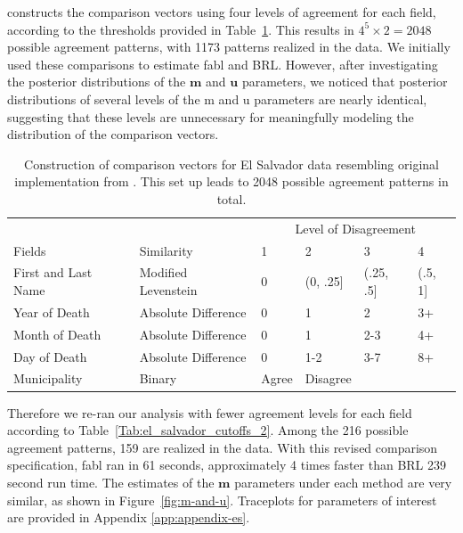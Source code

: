 \documentclass[ba]{imsart}
\begin{document}
	\cite{sadinle_bayesian_2017} constructs the comparison vectors using four levels of agreement for each field, according to the thresholds provided in Table~\ref{Tab:el_salvador_cutoffs_1}. This results in \(4^5 \times 2 = 2048\) possible agreement patterns, with 1173 patterns realized in the data. We initially used these comparisons to estimate fabl and BRL.  However, after investigating the posterior distributions of the $\bm{m}$ and $\bm{u}$ parameters, we noticed that posterior distributions of several levels of the m and u parameters are nearly identical, suggesting that these levels are unnecessary for meaningfully modeling the distribution of the comparison vectors. 
	
	
	
	\begin{table}
		\begin{tabular}[t]{llllll}
			\hline
			\multicolumn{2}{c}{ } & \multicolumn{4}{c}{Level of Disagreement} \\
			\cline{3-6}
			Fields & Similarity & 1 & 2 & 3 & 4\\
			\hline
			First and Last Name & Modified Levenstein & 0 & (0, .25] & (.25, .5] & (.5, 1]\\
			Year of Death & Absolute Difference & 0 & 1 & 2 & 3+\\
			Month of Death & Absolute Difference & 0 & 1 & 2-3 & 4+\\
			Day of Death & Absolute Difference & 0 & 1-2 & 3-7 & 8+\\
			Municipality & Binary & Agree & Disagree &  & \\
			\hline
		\end{tabular}
		\caption{Construction of comparison vectors for El Salvador data resembling original implementation from \citep{sadinle2018bayesian}. This set up leads to 2048 possible agreement patterns in total.}\label{Tab:el_salvador_cutoffs_1}
	\end{table}
	
	Therefore we re-ran our analysis with fewer agreement levels for each field according to Table~\ref{Tab:el_salvador_cutoffs_2}. Among the 216 possible agreement patterns, 159 are realized in the data. With this revised comparison specification, fabl ran in 61 seconds, approximately 4 times faster than BRL 239 second run time.  The estimates of the $\bm{m}$ parameters under each method are very similar, as shown in Figure~\ref{fig:m-and-u}. Traceplots for parameters of interest are provided in Appendix \ref{app:appendix-es}.
	
\end{document}
